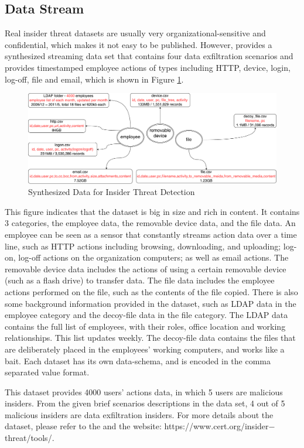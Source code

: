 \subsection{Data Stream}
Real insider threat datasets are usually very organizational-sensitive and confidential, which makes it not easy to be published. 
However, \cite{glasser2013bridging} provides a synthesized streaming data set that contains four data exfiltration scenarios and provides timestamped employee actions of types including HTTP, device, login, log-off, file and email, which is shown in Figure \ref{fig:dxd}.

\begin{figure}[!htbp]
	\centering
    \includegraphics[width=5in]{img/5-dxd.pdf}
    \caption{Synthesized Data for Insider Threat Detection}
    \label{fig:dxd}
\end{figure}

This figure indicates that the dataset is big in size and rich in content. 
It contains 3 categories, the employee data, the removable device data, and the file data. 
An employee can be seen as a sensor that constantly streams action data over a time line, such as HTTP actions including browsing, downloading, and uploading; 
log-on, log-off actions on the organization computers; as well as email actions.
The removable device data includes the actions of using a certain removable device (such as a flash drive) to transfer data.
The file data includes the employee actions performed on the file, such as the contents of the file copied.
There is also some background information provided in the dataset, such as LDAP data in the employee category and the decoy-file data in the file category. 
The LDAP data contains the full list of employees, with their roles, office location and working relationships. 
This list updates weekly. 
The decoy-file data contains the files that are deliberately placed in the employees' working computers, and works like a bait. 
Each dataset has its own data-schema, and is encoded in the comma separated value format.

This dataset provides 4000 users' actions data, in which 5 users are malicious insiders. 
From the given brief scenarios descriptions in the data set, 4 out of 5 malicious insiders are data exfiltration insiders. 
For more details about the dataset, please refer to the \cite{glasser2013bridging} and the website: https://www.cert.org/insider$-$threat/tools/.
%

